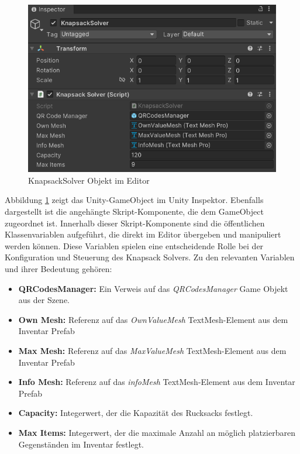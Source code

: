 \begin{figure}[H]
    \centering
    \includegraphics[scale=0.7]{images/knapsackEditor}
    \caption{KnapsackSolver Objekt im Editor}
    \label{fig:Knapsack_Editor}
\end{figure}

Abbildung \ref{fig:Knapsack_Editor} zeigt das Unity-GameObject im Unity Inspektor. Ebenfalls dargestellt ist die angehängte
Skript-Komponente, die dem GameObject zugeordnet ist. Innerhalb dieser Skript-Komponente sind die öffentlichen Klassenvariablen
aufgeführt, die direkt im Editor übergeben und manipuliert werden können. Diese Variablen spielen eine entscheidende Rolle
bei der Konfiguration und Steuerung des Knapsack Solvers. Zu den relevanten Variablen und ihrer Bedeutung gehören:
\begin{itemize}
    \item \textbf{QRCodesManager:} Ein Verweis auf das \textit{QRCodesManager} Game Objekt aus der Szene.

    \item \textbf{Own Mesh:} Referenz auf das \textit{OwnValueMesh} TextMesh-Element aus dem Inventar Prefab

    \item \textbf{Max Mesh:} Referenz auf das \textit{MaxValueMesh} TextMesh-Element aus dem Inventar Prefab

    \item \textbf{Info Mesh:} Referenz auf das \textit{infoMesh} TextMesh-Element aus dem Inventar Prefab

    \item \textbf{Capacity:} Integerwert, der die Kapazität des Rucksacks festlegt.

    \item \textbf{Max Items:} Integerwert, der die maximale Anzahl an möglich platzierbaren Gegenständen im Inventar
    festlegt.
\end{itemize}

